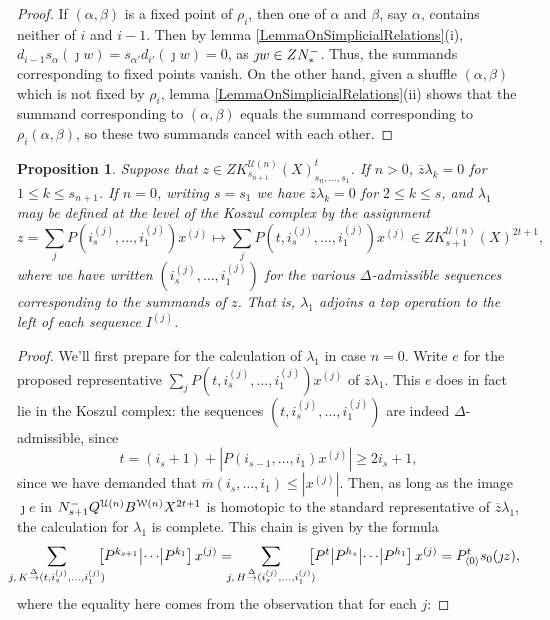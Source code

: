 \documentclass[11pt]{amsart}
\theoremstyle{plain}
\newtheorem{prop}[thm]{Proposition}
\theoremstyle{definition}
\newcommand{\calW}{\mathcal{W}}
\newcommand{\calU}{\mathcal{U}}
\theoremstyle{plain}
\newcommand{\deltaalg}{\Delta} %
\newcommand{\minDimP}{\overline{m}}
\newcommand{\produces}[3]{#3:#1\sim #2}
\renewcommand{\produces}[3]{#1\rightarrow_{#3} #2}%
\renewcommand{\produces}[3]{#1\overset{\smash{#3}}{\rightarrow} #2}%
\newcommand{\Nop}{N^{\smash{-}}}
\begin{document}
\begin{Koszul complexes}
\begin{proof}
If $(\alpha,\beta)$ is a fixed point of $\rho_i$, then one of $\alpha$ and $\beta$, say $\alpha$, contains neither of $i$ and $i-1$. Then by lemma \ref{LemmaOnSimplicialRelations}(i), $d_{i-1}s_\alpha(\jmath w)=s_{\alpha'}d_{i'}(\jmath w)=0$, as $\jmath w\in Z\Nop_*$. Thus, the summands corresponding to fixed points vanish.
On the other hand, given a shuffle $(\alpha,\beta)$ which is not fixed by $\rho_i$, lemma \ref{LemmaOnSimplicialRelations}(ii) shows that the summand corresponding to $(\alpha,\beta)$ equals the summand corresponding to $\rho_i(\alpha,\beta)$, so these two summands cancel with each other.
\end{proof}
\begin{prop}\label{QkTrivial}
Suppose that $z\in ZK^{\calU(n)}_{s_{n+1}}(X)_{s_n,\ldots,s_1}^t$. If $n>0$, $\overline{z}\lambda_k=0$ for $1\leq k\leq {s_{n+1}}$. If $n=0$, writing $s=s_1$ we have $\overline{z}\lambda_k=0$ for $2\leq k\leq {s}$, and $\lambda_1$ may be defined at the level of the Koszul complex by the assignment
\[z=\textstyle\sum_{j}P(i_{s}^{(j)},\ldots,i_1^{(j)})x^{(j)}{\longmapsto}\textstyle\sum_{j}P(t,i_{s}^{(j)},\ldots,i_1^{(j)})x^{(j)}\in ZK^{\calU(n)}_{s+1}(X)^{2t+1},\]
where we have written $(i_{s}^{(j)},\ldots,i_1^{(j)})$ for the various $\deltaalg$-admissible sequences corresponding to the summands of $z$. That is, $\lambda_1$ adjoins a top operation to the left of each sequence $I^{(j)}$.
\end{prop}
\begin{proof}
We'll first prepare for the calculation of $\lambda_1$ in case $n=0$.
Write $e$ for the proposed representative $\sum_{j}P(t,i_{s}^{(j)},\ldots,i_1^{(j)})x^{(j)}$ of $\overline{z}\lambda_1$. This $e$ does in fact lie in the Koszul complex: the sequences $(t,i_{s}^{(j)},\ldots,i_1^{(j)})$ are indeed $\deltaalg$-admissible, since
\[t=(i_{s}+1)+|P(i_{s-1},\ldots,i_1)x^{(j)}|\geq2i_{s}+1,\]
since we have demanded that $\minDimP(i_{s},\ldots,i_1)\leq|x^{(j)}|$. Then, as long as the image $\jmath e$ in $\Nop_{s+1}Q^{\calU(n)}B^{\calW(n)}X^{2t+1}$ is homotopic to the standard representative of $\overline{z}\lambda_1$, the calculation for $\lambda_1$ is complete. This chain is given by the formula
\[\!\!\!\!\sum_{j,\,\produces{K}{(t,i_{s}^{(j)},\ldots,i_1^{(j)})}{\deltaalg}}\!\!\!\!\left[P^{k_{s+1}} \middle|\cdots\middle|P^{k_1} \right]x^{(j)}
 =\!\!\!\!\sum_{j,\,\produces{H}{(i_{s}^{(j)},\ldots,i_1^{(j)})}{\deltaalg}}\!\!\!\!\left[P^t\middle|P^{h_{s}} \middle|\cdots\middle|P^{h_1} \right]x^{(j)}=P^{t}_{\langle 0\rangle}s_0(\jmath z),\]
where the equality here comes from the observation that for each $j$:

\end{proof}
\end{Koszul complexes}
\end{document}
